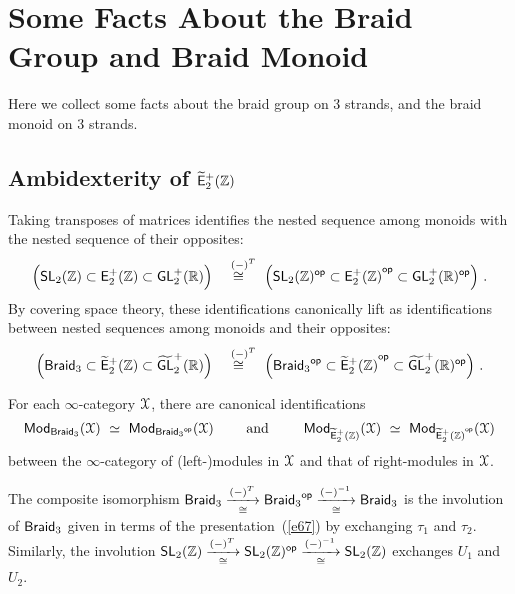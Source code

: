 
\chapter{Some Facts About the Braid Group and Braid Monoid}
\label{sec.B}
Here we collect some facts about the braid group on 3 strands, and the braid monoid on 3 strands.






\section{Ambidexterity of $\Ebraid$} \label{ambidex}




\begin{observation}
\label{t60}
Taking transposes of matrices identifies the nested sequence among monoids with the nested sequence of their opposites:
\[
\Bigl(
\SL_2(\ZZ)
\subset
\EpZ
\subset
\GL_2^+(\RR)
\Bigr)
~\overset{{}^{~{}~}(-)^T}\cong~
\Bigl(
\SL_2(\ZZ)^{\op}
\subset
\EpZ^{\op}
\subset
\GL_2^+(\RR)^{\op}
\Bigr)
~.
\]
By covering space theory, these identifications canonically lift as identifications between nested sequences among monoids and their opposites:
\[
\Bigl(
\Braid
\subset
\Ebraid
\subset
\w{\GL}_2^+(\RR)
\Bigr)
~\overset{{}^{~{}~}(-)^T}\cong~
\Bigl(
\Braid^{\op}
\subset
\Ebraid^{\op}
\subset
\w{\GL}_2^+(\RR)^{\op}
\Bigr)
~.
\]
\end{observation}


\begin{cor}
\label{t61}
For each $\infty$-category $\cX$, there are canonical identifications
\[
\Mod_{\Braid}(\cX)
~\simeq~
\Mod_{\Braid^{\op}}(\cX)
\qquad
\text{ and }
\qquad
\Mod_{\Ebraid}(\cX)
~\simeq~
\Mod_{\Ebraid^{\op}}(\cX)
\]
between the $\infty$-category of (left-)modules in $\cX$ and that of right-modules in $\cX$.

\end{cor}






\begin{remark}
The composite isomorphism
$\Braid \underset{\cong}{\xra{(-)^{T}}} \Braid^{\op}  \underset{\cong}{\xra{(-)^{-1}}} \Braid$ 
is the involution of $\Braid$ given in terms of the presentation~(\ref{e67}) by exchanging $\tau_1$ and $\tau_2$. 
Similarly, the involution
$\SL_2(\ZZ) \underset{\cong}{\xra{(-)^{T}}} \SL_2(\ZZ)^{\op}  \underset{\cong}{\xra{(-)^{-1}}} \SL_2(\ZZ)$ exchanges $U_1$ and $U_2$.  

\end{remark}







